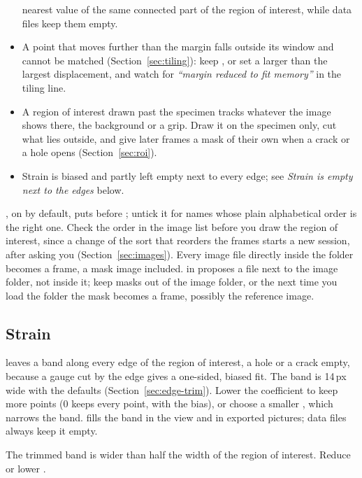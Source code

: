 \begin{description}[leftmargin=0.6cm,style=nextline]
\begin{itemize}
        nearest value of the same connected part of the region of interest, while data files
        keep them empty.
      \item A point that moves further than the margin falls outside its window and cannot be
        matched (Section~\ref{sec:tiling}): keep , or set a 
        larger than the largest displacement, and watch for \emph{``margin reduced to fit
        memory''} in the tiling line.
      \item A region of interest drawn past the specimen tracks whatever the image shows there,
        the background or a grip. Draw it on the specimen only, cut what lies outside, and give
        later frames a mask of their own when a crack or a hole opens (Section~\ref{sec:roi}).
      \item Strain is biased and partly left empty next to every edge; see \emph{Strain is empty
        next to the edges} below.
    \end{itemize}
  \item[Frames are in the wrong order, or an extra frame appears]
    , on by default, puts  before ; untick it
    for names whose plain alphabetical order is the right one. Check the order in the image list
    before you draw the region of interest, since a change of the sort that reorders the frames
    starts a new session, after asking you (Section~\ref{sec:images}). Every image file directly
    inside the folder becomes a frame, a mask image included.  in  proposes a file next to the image folder, not inside it; keep masks out of the
    image folder, or the next time you load the folder the mask becomes a frame, possibly the
    reference image.
\end{description}

\subsection{Strain}

\begin{description}[leftmargin=0.6cm,style=nextline]
  \item[Strain is empty next to the edges]
     leaves a band along every edge of the region of interest, a
    hole or a crack empty, because a gauge cut by the edge gives a one-sided, biased fit. The band
    is 14\,px wide with the defaults (Section~\ref{sec:edge-trim}). Lower the coefficient to keep
    more points (0 keeps every point, with the bias), or choose a smaller , which
    narrows the band.  fills the band in the view and in
    exported pictures; data files always keep it empty.
  \item[``Strain Computation Failed'': ``Edge trimming would remove every strain point'']
    The trimmed band is wider than half the width of the region of interest. Reduce 
    or lower .
\end{description}

